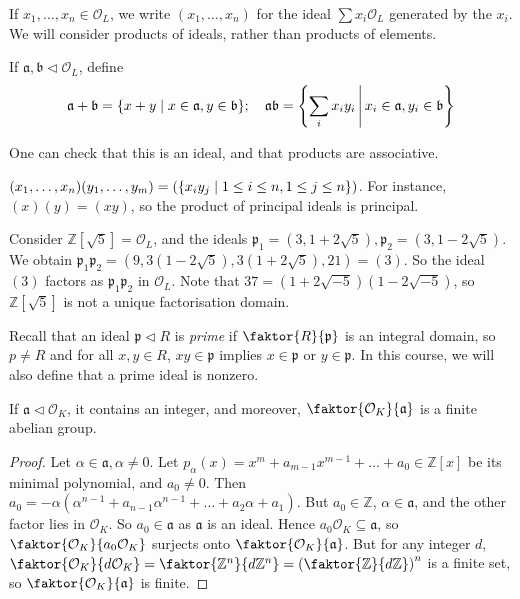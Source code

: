 If \( x_1, \dots, x_n \in \mathcal O_L \), we write \( (x_1, \dots, x_n) \) for the ideal \( \sum x_i \mathcal O_L \) generated by the \( x_i \).
We will consider products of ideals, rather than products of elements.
\begin{definition}
    If \( \mathfrak a, \mathfrak b \triangleleft \mathcal O_L \), define
    \[ \mathfrak a + \mathfrak b = \qty{x + y \mid x \in \mathfrak a, y \in \mathfrak b};\quad \mathfrak a \mathfrak b = \qty{\sum_i x_i y_i \,\middle|\,x_i \in \mathfrak a, y_i \in \mathfrak b} \]
\end{definition}
One can check that this is an ideal, and that products are associative.
\begin{example}
    \( (x_1, \dots, x_n) (y_1, \dots, y_m) = \qty(\qty{x_i y_j \mid 1 \leq i \leq n, 1 \leq j \leq n}) \).
    For instance, \( (x)(y) = (xy) \), so the product of principal ideals is principal.
\end{example}
\begin{example}
    Consider \( \mathbb Z[\sqrt{5}] = \mathcal O_L \), and the ideals \( \mathfrak p_1 = (3, 1 + 2\sqrt{5}), \mathfrak p_2 = (3, 1-2\sqrt{5}) \).
    We obtain \( \mathfrak p_1 \mathfrak p_2 = (9, 3(1-2\sqrt{5}), 3(1+2\sqrt{5}), 21) = (3) \).
    So the ideal \( (3) \) factors as \( \mathfrak p_1 \mathfrak p_2 \) in \( \mathcal O_L \).
    Note that \( 37 = (1 + 2\sqrt{-5})(1 - 2\sqrt{-5}) \), so \( \mathbb Z[\sqrt{5}] \) is not a unique factorisation domain.
\end{example}
Recall that an ideal \( \mathfrak p \triangleleft R \) is \emph{prime} if \( \faktor{R}{\mathfrak p} \) is an integral domain, so \( p \neq R \) and for all \( x, y \in R \), \( xy \in \mathfrak p \) implies \( x \in \mathfrak p \) or \( y \in \mathfrak p \).
In this course, we will also define that a prime ideal is nonzero.
\begin{lemma}
    If \( \mathfrak a \triangleleft \mathcal O_K \), it contains an integer, and moreover, \( \faktor{\mathcal O_K}{\mathfrak a} \) is a finite abelian group.
\end{lemma}
\begin{proof}
    Let \( \alpha \in \mathfrak a, \alpha \neq 0 \).
    Let \( p_\alpha(x) = x^m + a_{m-1} x^{m-1} + \dots + a_0 \in \mathbb Z[x] \) be its minimal polynomial, and \( a_0 \neq 0 \).
    Then \( a_0 = -\alpha(\alpha^{n-1} + a_{n-1} \alpha^{n-1} + \dots + a_2 \alpha + a_1) \).
    But \( a_0 \in \mathbb Z \), \( \alpha \in \mathfrak a \), and the other factor lies in \( \mathcal O_K \).
    So \( a_0 \in \mathfrak a \) as \( \mathfrak a \) is an ideal.
    Hence \( a_0 \mathcal O_K \subseteq \mathfrak a \), so \( \faktor{\mathcal O_K}{a_0 \mathcal O_K} \) surjects onto \( \faktor{\mathcal O_K}{\mathfrak a} \).
    But for any integer \( d \), \( \faktor{\mathcal O_K}{d\mathcal O_K} = \faktor{\mathbb Z^n}{d\mathbb Z^n} = \qty(\faktor{\mathbb Z}{d\mathbb Z})^n \) is a finite set, so \( \faktor{\mathcal O_K}{\mathfrak a} \) is finite.
\end{proof}
